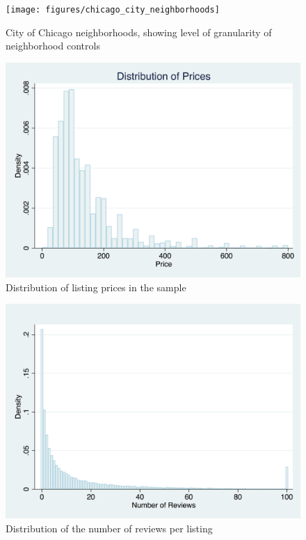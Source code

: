 \begin{figure}\centering
	\texttt{[image: figures/chicago\_city\_neighborhoods]}
	\caption[City of Chicago neighborhoods]{City of Chicago neighborhoods, showing level of granularity of neighborhood controls}
	\label{fig:chicago}
\end{figure}

\begin{figure}\centering
	\includegraphics[width=.9\textwidth]{figures/fig1_price}
	\caption{Distribution of listing prices in the sample}
	\label{fig:prices}
\end{figure}

\begin{figure}\centering
	\includegraphics[width=.8\textwidth]{figures/fig2_num_reviews}
	\caption{Distribution of the number of reviews per listing}
	\label{fig:num_reviews}
\end{figure}

